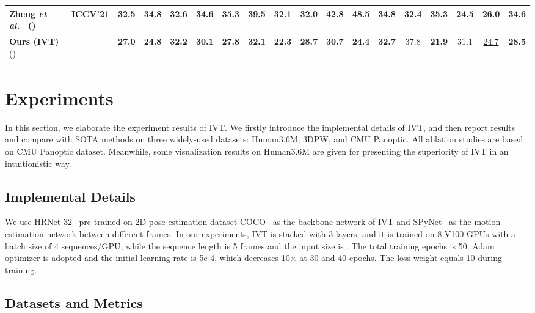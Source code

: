 \documentclass[sigconf]{acmart}
\newcommand{\etal}{\textit{et al.~}}
\begin{document}
\begin{table*}[!t]
{\begin{tabular}{lccccccccccccccccc}
\multicolumn{1}{l|}{Zheng \etal \cite{zheng20213d} ()}        & \multicolumn{1}{c|}{ICCV'21}    & 32.5 & \underline{34.8}  & \underline{32.6} & 34.6  & \underline{35.3}  & \underline{39.5}  & 32.1 & \underline{32.0}   & 42.8 & \underline{48.5}  & \underline{34.8}  & \textbf{32.4} & \underline{35.3}   & \textbf{24.5} & \multicolumn{1}{c|}{26.0} & \underline{34.6} \\
\hline
\multicolumn{1}{l|}{\textbf{Ours (IVT)} ()} & \multicolumn{1}{c|}{}  & \textbf{27.0} & \textbf{24.8}  & \textbf{32.2} & \textbf{30.1}  & \textbf{27.8}  &  \textbf{32.1} & \textbf{22.3} & \textbf{28.7} & \textbf{30.7} & \textbf{24.4}  & \textbf{32.7}  & 37.8 & \textbf{21.9} & 31.1 & \multicolumn{1}{c|}{\underline{24.7}} & \textbf{28.5} \\
\hline

\hline
\end{tabular}
}
\label{tab:h36m}
\end{table*}

\section{Experiments}
In this section, we elaborate the experiment results of IVT. We firstly introduce the implemental details of IVT, and then report results and compare with SOTA methods on three widely-used datasets: Human3.6M, 3DPW, and CMU Panoptic. All ablation studies are based on CMU Panoptic dataset. Meanwhile, some visualization results on Human3.6M are given for presenting the superiority of IVT in an intuitionistic way.

\subsection{Implemental Details}
We use HRNet-32~\cite{wang2020deep} pre-trained on 2D pose estimation dataset COCO~\cite{lin2014microsoft} as the backbone network of IVT and SPyNet~\cite{ranjan2017optical} as the motion estimation network between different frames. In our experiments, IVT is stacked with 3 layers, and it is trained on 8 V100 GPUs with a batch size of 4 sequences/GPU, while the sequence length is 5 frames and the input size is . The total training epochs is 50. Adam optimizer is adopted and the initial learning rate is 5e-4, which decreases 10× at 30 and 40 epochs. The loss weight  equals 10 during training.

\subsection{Datasets and Metrics}
\end{document}
